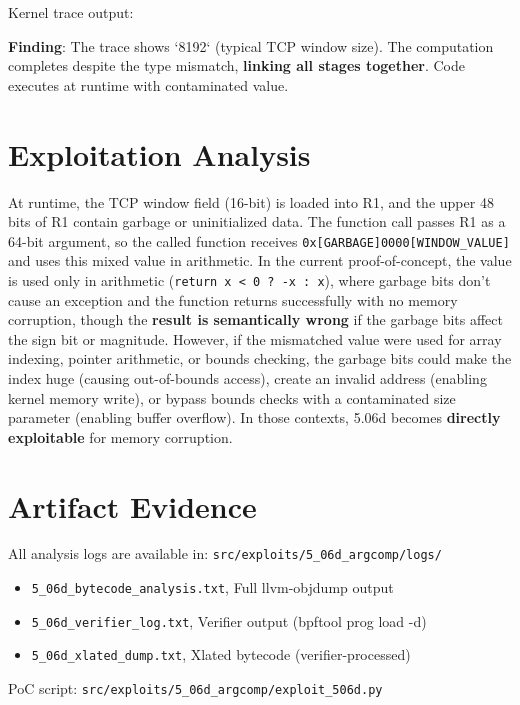 \noindent
Kernel trace output:

\vspace{0.3cm}
\noindent
{}
\vspace{0.3cm}

\noindent
\textbf{Finding}: The trace shows `8192` (typical TCP window size). The computation completes despite the type mismatch, \textbf{linking all stages together}. Code executes at runtime with contaminated value.

\section{Exploitation Analysis}

At runtime, the TCP window field (16-bit) is loaded into R1, and the upper 48 bits of R1 contain garbage or uninitialized data. The function call passes R1 as a 64-bit argument, so the called function receives \texttt{0x[GARBAGE]0000[WINDOW\_VALUE]} and uses this mixed value in arithmetic. In the current proof-of-concept, the value is used only in arithmetic (\texttt{return x < 0 ? -x : x}), where garbage bits don't cause an exception and the function returns successfully with no memory corruption, though the \textbf{result is semantically wrong} if the garbage bits affect the sign bit or magnitude. However, if the mismatched value were used for array indexing, pointer arithmetic, or bounds checking, the garbage bits could make the index huge (causing out-of-bounds access), create an invalid address (enabling kernel memory write), or bypass bounds checks with a contaminated size parameter (enabling buffer overflow). In those contexts, 5.06d becomes \textbf{directly exploitable} for memory corruption.

\section{Artifact Evidence}

All analysis logs are available in: \texttt{src/exploits/5\_06d\_argcomp/logs/}

\begin{itemize}
  \item \texttt{5\_06d\_bytecode\_analysis.txt}, Full llvm-objdump output
  \item \texttt{5\_06d\_verifier\_log.txt}, Verifier output (bpftool prog load -d)
  \item \texttt{5\_06d\_xlated\_dump.txt}, Xlated bytecode (verifier-processed)
\end{itemize}

\noindent
PoC script: \texttt{src/exploits/5\_06d\_argcomp/exploit\_506d.py}
